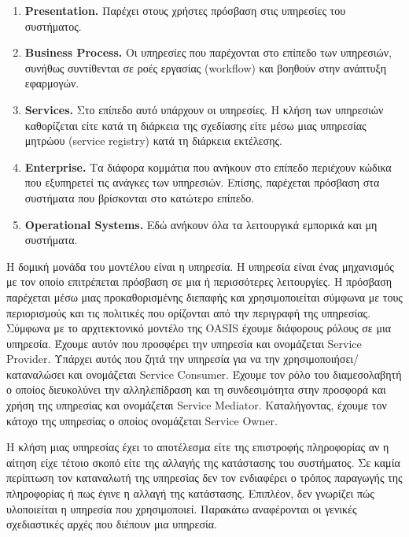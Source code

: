 \begin{enumerate}
\setcounter{enumi}{\thenumberedCntF}
\item \textbf{Presentation.} Παρέχει στους χρήστες πρόσβαση στις 
υπηρεσίες του συστήματος.
\item \textbf{Business Process.} Οι υπηρεσίες που παρέχονται στο 
επίπεδο των υπηρεσιών, συνήθως συντίθενται σε ροές εργασίας (workflow) 
και βοηθούν στην ανάπτυξη εφαρμογών.
\item \textbf{Services.} Στο επίπεδο αυτό υπάρχουν οι υπηρεσίες. Η 
κλήση των υπηρεσιών καθορίζεται είτε κατά τη διάρκεια της σχεδίασης είτε 
μέσω μιας υπηρεσίας μητρώου (service registry) κατά τη διάρκεια 
εκτέλεσης.
\item \textbf{Enterprise.} Τα διάφορα κομμάτια που ανήκουν στο επίπεδο 
περιέχουν κώδικα που εξυπηρετεί τις ανάγκες των υπηρεσιών. Επίσης, 
παρέχεται πρόσβαση στα συστήματα που βρίσκονται στο κατώτερο επίπεδο.
\item \textbf{Operational Systems.} Εδώ ανήκουν όλα τα λειτουργικά 
εμπορικά και μη συστήματα.
\setcounter{numberedCntF}{\theenumi}
\end{enumerate}

Η δομική μονάδα του μοντέλου είναι η υπηρεσία. Η υπηρεσία είναι ένας 
μηχανισμός με τον οποίο επιτρέπεται πρόσβαση σε μια ή περισσότερες 
λειτουργίες. Η πρόσβαση παρέχεται μέσω μιας προκαθορισμένης διεπαφής και 
χρησιμοποιείται σύμφωνα με τους περιορισμούς και τις πολιτικές που 
ορίζονται από την περιγραφή της υπηρεσίας. Σύμφωνα με το αρχιτεκτονικό 
μοντέλο της OASIS \citep{OASIS-soa-raf} 
έχουμε διάφορους ρόλους σε μια υπηρεσία. Έχουμε 
αυτόν που προσφέρει την υπηρεσία και ονομάζεται Service Provider. 
Υπάρχει αυτός που ζητά την υπηρεσία για να την 
χρησιμοποιήσει/καταναλώσει και ονομάζεται Service Consumer. Έχουμε τον 
ρόλο του διαμεσολαβητή ο οποίος διευκολύνει την αλληλεπίδραση και τη 
συνδεσιμότητα στην προσφορά και χρήση της υπηρεσίας και ονομάζεται 
Service Mediator. Καταλήγοντας, έχουμε τον κάτοχο της υπηρεσίας ο οποίος 
ονομάζεται Service Owner.

Η κλήση μιας υπηρεσίας έχει το αποτέλεσμα είτε της επιστροφής 
πληροφορίας αν η αίτηση είχε τέτοιο σκοπό είτε της αλλαγής της 
κατάστασης του συστήματος. Σε καμία περίπτωση τον καταναλωτή της 
υπηρεσίας δεν τον ενδιαφέρει ο τρόπος παραγωγής της πληροφορίας ή πως 
έγινε η αλλαγή της κατάστασης. Επιπλέον, δεν γνωρίζει πώς υλοποιείται η 
υπηρεσία που χρησιμοποιεί. Παρακάτω αναφέρονται οι γενικές σχεδιαστικές 
αρχές που διέπουν μια υπηρεσία.

